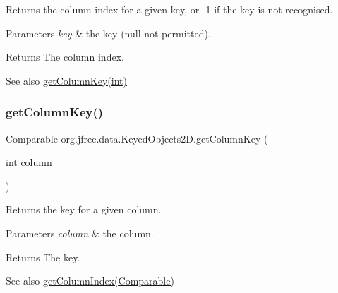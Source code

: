 Returns the column index for a given key, or {\ttfamily -\/1} if the key is not recognised.


\begin{DoxyParams}{Parameters}
{\em key} & the key ({\ttfamily null} not permitted).\\
\hline
\end{DoxyParams}
\begin{DoxyReturn}{Returns}
The column index.
\end{DoxyReturn}
\begin{DoxySeeAlso}{See also}
\mbox{\hyperlink{classorg_1_1jfree_1_1data_1_1_keyed_objects2_d_a76538aa5c0a5f1b7ea9bc7d52251504e}{get\+Column\+Key(int)}} 
\end{DoxySeeAlso}
\mbox{\label{classorg_1_1jfree_1_1data_1_1_keyed_objects2_d_a76538aa5c0a5f1b7ea9bc7d52251504e}} 
\subsubsection{\texorpdfstring{get\+Column\+Key()}{getColumnKey()}}
{\footnotesize\ttfamily Comparable org.\+jfree.\+data.\+Keyed\+Objects2\+D.\+get\+Column\+Key (\begin{DoxyParamCaption}\item[{int}]{column }\end{DoxyParamCaption})}

Returns the key for a given column.


\begin{DoxyParams}{Parameters}
{\em column} & the column.\\
\hline
\end{DoxyParams}
\begin{DoxyReturn}{Returns}
The key.
\end{DoxyReturn}
\begin{DoxySeeAlso}{See also}
\mbox{\hyperlink{classorg_1_1jfree_1_1data_1_1_keyed_objects2_d_a40168035f23e5d7cc542e079ff71573d}{get\+Column\+Index(\+Comparable)}} 
\end{DoxySeeAlso}
\mbox{\label{classorg_1_1jfree_1_1data_1_1_keyed_objects2_d_ae5ece09fdc7f933454852e74f21a14d7}} 
